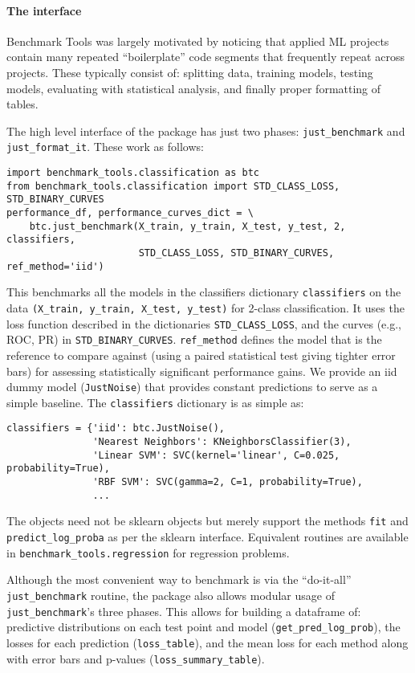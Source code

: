 \documentclass{article}
\newcommand{\code}{\texttt}
\newcommand{\sectionx}{\paragraph}
\begin{document}
\sectionx{The interface}
Benchmark Tools was largely motivated by noticing that applied ML projects contain many repeated ``boilerplate'' code segments that frequently repeat across projects.
These typically consist of: splitting data, training models, testing models, evaluating with statistical analysis, and finally proper formatting of tables.

The high level interface of the package has just two phases: \code{just\_benchmark} and \code{just\_format\_it}.
These work as follows:
\vspace{-3mm}
\begin{verbatim}
import benchmark_tools.classification as btc
from benchmark_tools.classification import STD_CLASS_LOSS, STD_BINARY_CURVES
performance_df, performance_curves_dict = \
    btc.just_benchmark(X_train, y_train, X_test, y_test, 2, classifiers,
                       STD_CLASS_LOSS, STD_BINARY_CURVES, ref_method='iid')
\end{verbatim}
\vspace{-3mm}
This benchmarks all the models in the classifiers dictionary \code{classifiers} on the data \code{(X\_train, y\_train, X\_test, y\_test)} for 2-class classification.
It uses the loss function described in the dictionaries \code{STD\_CLASS\_LOSS}, and the curves (e.g., ROC, PR) in \code{STD\_BINARY\_CURVES}.
\code{ref\_method} defines the model that is the reference to compare against (using a paired statistical test giving tighter error bars) for assessing statistically significant performance gains.
We provide an iid dummy model (\code{JustNoise}) that provides constant predictions to serve as a simple baseline.
The \code{classifiers} dictionary is as simple as:
\vspace{-3mm}
\begin{verbatim}
classifiers = {'iid': btc.JustNoise(),
               'Nearest Neighbors': KNeighborsClassifier(3),
               'Linear SVM': SVC(kernel='linear', C=0.025, probability=True),
               'RBF SVM': SVC(gamma=2, C=1, probability=True),
               ...
\end{verbatim}
\vspace{-3mm}
The objects need not be sklearn objects but merely support the methods \code{fit} and \code{predict\_log\_proba} as per the sklearn interface.
Equivalent routines are available in \code{benchmark\_tools.regression} for regression problems.

Although the most convenient way to benchmark is via the ``do-it-all'' \code{just\_benchmark} routine, the package also allows modular usage of \code{just\_benchmark}'s three phases.
This allows for building a dataframe of: predictive distributions on each test point and model (\code{get\_pred\_log\_prob}), the losses for each prediction (\code{loss\_table}), and the mean loss for each method along with error bars and p-values (\code{loss\_summary\_table})\@.
\end{document}
